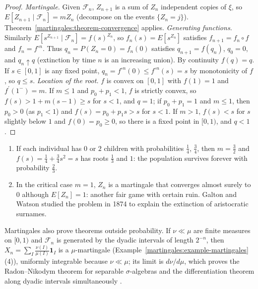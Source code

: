 \begin{proof}
\emph{Martingale.} Given $\mathcal{F}_n$, $Z_{n+1}$ is a sum of $Z_n$ independent copies of $\xi$, so $E[Z_{n+1} \mid \mathcal{F}_n] = mZ_n$ (decompose on the events $\{Z_n = j\}$). Theorem~\ref{martingales:theorem-convergence} applies.
\emph{Generating functions.} Similarly $E[s^{Z_{n+1}} \mid \mathcal{F}_n] = f(s)^{Z_n}$, so $f_n(s) = E[s^{Z_n}]$ satisfies $f_{n+1} = f_n \circ f$ and $f_n = f^{\circ n}$. Thus $q_n = P(Z_n = 0) = f_n(0)$ satisfies $q_{n+1} = f(q_n)$,
$q_0 = 0$, and $q_n \uparrow q$ (extinction by time $n$ is an increasing union). By continuity $f(q) = q$. If $s \in [0, 1]$ is any fixed point, $q_n = f^{\circ n}(0) \leq f^{\circ n}(s) = s$ by monotonicity of $f$, so $q \leq s$.
\emph{Location of the root.} $f$ is convex on $[0, 1]$ with $f(1) = 1$ and $f^{\prime}(1^-) = m$. If $m \leq 1$ and $p_0 + p_1 < 1$, $f$ is strictly convex, so $f(s) > 1 + m(s - 1) \geq s$ for $s < 1$, and $q = 1$; if $p_0 + p_1 = 1$ and
$m \leq 1$, then $p_0 > 0$ (as $p_1 < 1$) and $f(s) = p_0 + p_1s > s$ for $s < 1$. If $m > 1$, $f(s) < s$ for $s$ slightly below $1$ and $f(0) = p_0 \geq 0$, so there is a fixed point in $[0, 1)$, and $q < 1$.
\end{proof}

\begin{example}\label{martingales:example-branching}
\begin{enumerate}
\item If each individual has $0$ or $2$ children with probabilities $\frac14$, $\frac34$, then $m = \frac32$ and $f(s) = \frac14 + \frac34s^2 = s$ has roots $\frac13$ and $1$: the population survives forever with probability $\frac23$.
\item In the critical case $m = 1$, $Z_n$ is a martingale that converges almost surely to $0$ although $E[Z_n] = 1$: another fair game with certain ruin. Galton and Watson studied the problem in 1874 to explain the
extinction of aristocratic surnames.
\end{enumerate}
\end{example}

\begin{remark}\label{martingales:remark-radon-nikodym}
Martingales also prove theorems outside probability. If $\nu \ll \mu$ are finite measures on $[0, 1)$ and $\mathcal{F}_n$ is generated by the dyadic intervals of length $2^{-n}$, then
$X_n = \sum_I\frac{\nu(I)}{\mu(I)}\mathbf{1}_I$ is a $\mu$-martingale (Example~\ref{martingales:example-martingales}(4)), uniformly integrable because $\nu \ll \mu$; its limit is $d\nu/d\mu$, which proves the Radon--Nikodym theorem
for separable $\sigma$-algebras and the differentiation theorem along dyadic intervals simultaneously \cite{williams-martingales}.
\end{remark}

